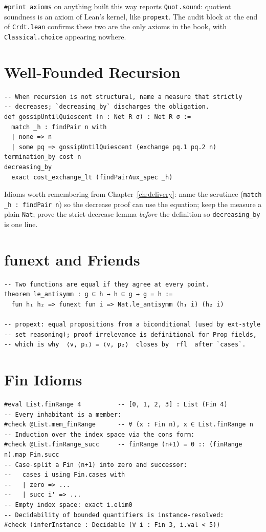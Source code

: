\documentclass[12pt, a4paper, openright]{book}
\theoremstyle{thmstyle}
\theoremstyle{defstyle}
\newcommand{\lc}[1]{\texttt{#1}}
\newenvironment{notebox}{%
  \begin{tcolorbox}[notebox]%
}{\end{tcolorbox}}
\begin{document}
\begin{notebox}
  \texttt{\#print axioms} on anything built this way reports
  \lc{Quot.sound}: quotient soundness is an axiom of Lean's kernel,
  like \lc{propext}. The audit block at the end of \texttt{Crdt.lean}
  confirms these two are the only axioms in the book, with
  \lc{Classical.choice} appearing nowhere.
\end{notebox}

\section{Well-Founded Recursion}

\begin{verbatim}
-- When recursion is not structural, name a measure that strictly
-- decreases; `decreasing_by` discharges the obligation.
def gossipUntilQuiescent (n : Net R σ) : Net R σ :=
  match _h : findPair n with
  | none => n
  | some pq => gossipUntilQuiescent (exchange pq.1 pq.2 n)
termination_by cost n
decreasing_by
  exact cost_exchange_lt (findPairAux_spec _h)
\end{verbatim}

Idioms worth remembering from Chapter~\ref{ch:delivery}: name the
scrutinee (\lc{match _h : findPair n}) so the decrease proof can use the
equation; keep the measure a plain \lc{Nat}; prove the strict-decrease
lemma \emph{before} the definition so \lc{decreasing_by} is one line.

\section{funext and Friends}

\begin{verbatim}
-- Two functions are equal if they agree at every point.
theorem le_antisymm : g ⊑ h → h ⊑ g → g = h :=
  fun h₁ h₂ => funext fun i => Nat.le_antisymm (h₁ i) (h₂ i)

-- propext: equal propositions from a biconditional (used by ext-style
-- set reasoning); proof irrelevance is definitional for Prop fields,
-- which is why  ⟨v, p₁⟩ = ⟨v, p₂⟩  closes by  rfl  after `cases`.
\end{verbatim}

\section{Fin Idioms}

\begin{verbatim}
#eval List.finRange 4          -- [0, 1, 2, 3] : List (Fin 4)
-- Every inhabitant is a member:
#check @List.mem_finRange      -- ∀ (x : Fin n), x ∈ List.finRange n
-- Induction over the index space via the cons form:
#check @List.finRange_succ     -- finRange (n+1) = 0 :: (finRange n).map Fin.succ
-- Case-split a Fin (n+1) into zero and successor:
--   cases i using Fin.cases with
--   | zero => ...
--   | succ i' => ...
-- Empty index space: exact i.elim0
-- Decidability of bounded quantifiers is instance-resolved:
#check (inferInstance : Decidable (∀ i : Fin 3, i.val < 5))
\end{verbatim}
\end{document}
